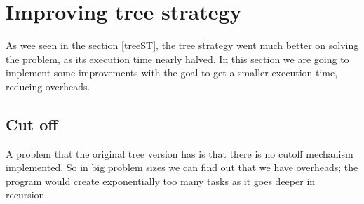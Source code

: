 \documentclass{article}
\begin{document}

\clearpage
\section{Improving tree strategy}
\justify
As wee seen in the section \ref{treeST}, the tree strategy went much better on solving the problem, as its execution time nearly halved. In this section we are going to implement some improvements with the goal to get a smaller execution time, reducing overheads.

\subsection{Cut off}
\justify
A problem that the original tree version has is that there is no cutoff mechanism implemented. So in big problem sizes we can find out that we have overheads; the program would create exponentially too many tasks as it goes deeper in recursion.
\end{document}
